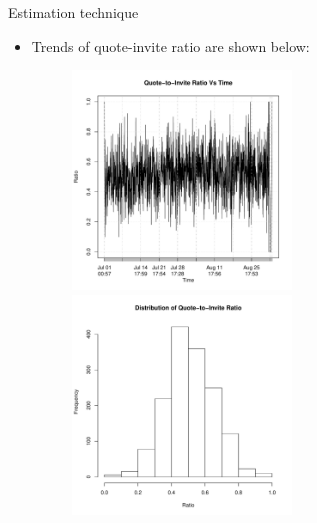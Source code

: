\documentclass{beamer}
\begin{document}
\begin{frame}{Estimation technique}{}
	\begin{itemize}		
		\vspace{-0.1in}
		\item{Trends of quote-invite ratio are shown below:}\vspace{0.1 in}
	\begin{figure}
		\begin{itemize}
			\begin{center}
				\vspace*{-0.1in}
				\hspace*{-0.8in}
				\includegraphics[width=0.55\textwidth]{hr_plot.pdf} 
	 			 \includegraphics[width=0.55\textwidth]{hr_dist.pdf} 
			\end{center}
		\end{itemize}
	\end{figure}
		\end{itemize}
\end{frame}
\end{document}

